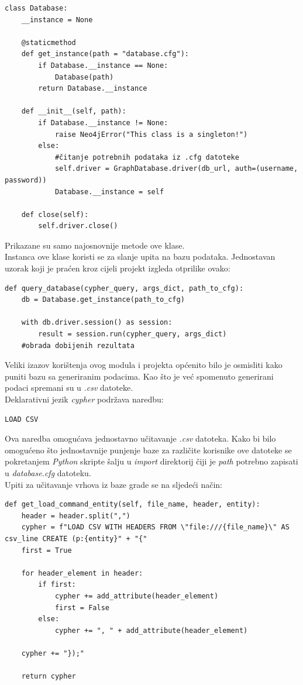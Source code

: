 \documentclass[titlepage, 12pt]{scrartcl}
\begin{document}
\begin{samepage}
\begin{verbatim}
class Database:
    __instance = None

    @staticmethod
    def get_instance(path = "database.cfg"):
        if Database.__instance == None:
            Database(path)
        return Database.__instance

    def __init__(self, path):
        if Database.__instance != None:
            raise Neo4jError("This class is a singleton!")
        else:
            #čitanje potrebnih podataka iz .cfg datoteke
            self.driver = GraphDatabase.driver(db_url, auth=(username, password))
            Database.__instance = self

    def close(self):
        self.driver.close()
\end{verbatim}
\end{samepage}
Prikazane su samo najosnovnije metode ove klase. \\
Instanca ove klase koristi se za slanje upita na bazu podataka. Jednostavan uzorak koji je praćen kroz cijeli projekt izgleda otprilike ovako:
\begin{samepage}
\begin{verbatim}
def query_database(cypher_query, args_dict, path_to_cfg):
    db = Database.get_instance(path_to_cfg)
    
    with db.driver.session() as session:
        result = session.run(cypher_query, args_dict)
    #obrada dobijenih rezultata
\end{verbatim}
\end{samepage}
Veliki izazov korištenja ovog modula i projekta općenito bilo je osmisliti kako puniti bazu sa generiranim podacima. Kao što je već spomenuto generirani podaci spremani su u \emph{.csv} datoteke. \\
Deklarativni jezik \emph{cypher} podržava naredbu: 
\begin{verbatim}
LOAD CSV
\end{verbatim}
Ova naredba omogućava jednostavno učitavanje \emph{.csv} datoteka. Kako bi bilo omogućeno što jednostavnije punjenje baze za različite korisnike ove datoteke se pokretanjem \emph{Python} skripte šalju u \emph{import} direktorij čiji je \emph{path} potrebno zapisati u \emph{database.cfg} datoteku. \\
Upiti za učitavanje vrhova iz baze grade se na sljedeći način:
\begin{samepage}
\begin{verbatim}
def get_load_command_entity(self, file_name, header, entity):
    header = header.split(",")
    cypher = f"LOAD CSV WITH HEADERS FROM \"file:///{file_name}\" AS csv_line CREATE (p:{entity}" + "{"
    first = True

    for header_element in header:
        if first:
            cypher += add_attribute(header_element)
            first = False
        else:
            cypher += ", " + add_attribute(header_element)

    cypher += "});"

    return cypher
\end{verbatim}
\end{samepage}
\end{document}
